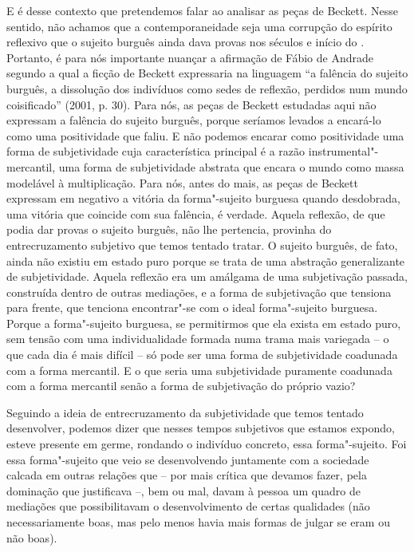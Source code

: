E é desse contexto que pretendemos falar ao analisar as peças de
Beckett. Nesse sentido, não achamos que a contemporaneidade seja uma
corrupção do espírito reflexivo que o sujeito burguês ainda dava provas
nos séculos  e início do . Portanto, é para nós importante nuançar
a afirmação de Fábio de Andrade segundo a qual a ficção de Beckett
expressaria na linguagem ``a falência do sujeito burguês, a dissolução
dos indivíduos como sedes de reflexão, perdidos num mundo coisificado''
(2001, p. 30). Para nós, as peças de Beckett estudadas aqui não
expressam a falência do sujeito burguês, porque seríamos levados a
encará-lo como uma positividade que faliu. E não podemos encarar como
positividade uma forma de subjetividade cuja característica principal é
a razão instrumental"-mercantil, uma forma de subjetividade abstrata que
encara o mundo como massa modelável à multiplicação. Para nós, antes do
mais, as peças de Beckett expressam em negativo a vitória da
forma"-sujeito burguesa quando desdobrada, uma vitória que coincide com
sua falência, é verdade. Aquela reflexão, de que podia dar provas o
sujeito burguês, não lhe pertencia, provinha do entrecruzamento
subjetivo que temos tentado tratar. O sujeito burguês, de fato, ainda
não existiu em estado puro porque se trata de uma abstração
generalizante de subjetividade. Aquela reflexão era um amálgama de uma
subjetivação passada, construída dentro de outras mediações, e a forma
de subjetivação que tensiona para frente, que tenciona encontrar"-se com
o ideal forma"-sujeito burguesa. Porque a forma"-sujeito burguesa, se
permitirmos que ela exista em estado puro, sem tensão com uma
individualidade formada numa trama mais variegada -- o que cada dia é
mais difícil -- só pode ser uma forma de subjetividade coadunada com a
forma mercantil. E o que seria uma subjetividade puramente coadunada com
a forma mercantil senão a forma de subjetivação do próprio vazio?

Seguindo a ideia de entrecruzamento da subjetividade que temos tentado
desenvolver, podemos dizer que nesses tempos subjetivos que estamos
expondo, esteve presente em germe, rondando o indivíduo concreto, essa
forma"-sujeito. Foi essa forma"-sujeito que veio se desenvolvendo
juntamente com a sociedade calcada em outras relações que -- por mais
crítica que devamos fazer, pela dominação que justificava --, bem ou
mal, davam à pessoa um quadro de mediações que possibilitavam o
desenvolvimento de certas qualidades (não necessariamente boas, mas pelo
menos havia mais formas de julgar se eram ou não boas).

